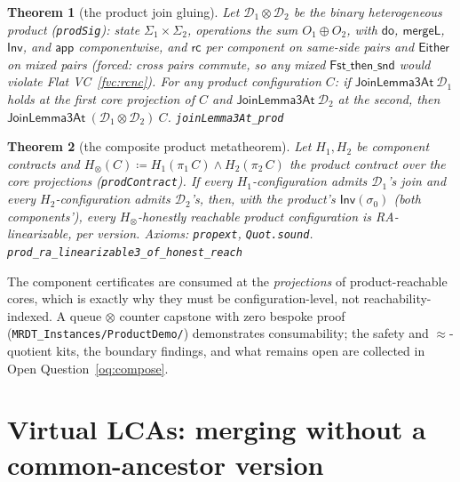 \documentclass[11pt]{article}
\newtheorem{theorem}{Theorem}[section]
\newcommand{\rcrel}{\mathsf{rc}}                 %
\newcommand{\mergeL}{\mathsf{mergeL}}
\newcommand{\Sinit}{\sigma_0}
\newcommand{\lean}[1]{\texttt{#1}}
\newcommand{\M}[1]{\mathcal{#1}}
\newcommand{\dodo}{\mathsf{do}}
\newcommand{\eqobs}{\approx}
\newcommand{\Inv}{\mathsf{Inv}}
\newcommand{\app}{\mathsf{app}}
\newcommand{\Either}{\textsf{Either}}
\begin{document}
\begin{theorem}[the product join gluing]
\label{thm:prodjoin}
Let $\M{D}_1 \otimes \M{D}_2$ be the binary heterogeneous product
(\lean{prodSig}): state $\Sigma_1 \times \Sigma_2$, operations the sum
$O_1 \oplus O_2$, with $\dodo$, $\mergeL$, $\Inv$, and $\app$
componentwise, and $\rcrel$ per component on same-side pairs and
$\Either$ on mixed pairs (forced: cross pairs commute, so any mixed
$\mathsf{Fst\_then\_snd}$ would violate Flat VC~\ref{fvc:rcnc}). For any
product configuration $C$: if $\mathsf{JoinLemma3At}\ \M{D}_1$ holds at
the first core projection of $C$ and $\mathsf{JoinLemma3At}\ \M{D}_2$ at
the second, then $\mathsf{JoinLemma3At}\ (\M{D}_1 \otimes \M{D}_2)\ C$.
\hfill\lean{joinLemma3At\_prod}
\end{theorem}

\begin{theorem}[the composite product metatheorem]
\label{thm:prodmeta}
Let $H_1, H_2$ be component contracts and
$H_\otimes(C) \coloneqq H_1(\pi_1\, C) \wedge H_2(\pi_2\, C)$ the product
contract over the core projections (\lean{prodContract}). If every
$H_1$-configuration admits $\M{D}_1$'s join and every $H_2$-configuration
admits $\M{D}_2$'s, then, with the product's $\Inv(\Sinit)$ (both
components'), every $H_\otimes$-honestly reachable product configuration
is RA-linearizable, per version. Axioms: \lean{propext},
\lean{Quot.sound}.
\hfill\lean{prod\_ra\_linearizable3\_of\_honest\_reach}
\end{theorem}

The component certificates are consumed at the \emph{projections} of
product-reachable cores, which is exactly why they must be
configuration-level, not reachability-indexed. A queue $\otimes$ counter
capstone with zero bespoke proof (\lean{MRDT\_Instances/ProductDemo/})
demonstrates consumability; the safety and $\eqobs$-quotient kits, the
boundary findings, and what remains open are collected in Open
Question~\ref{oq:compose}.

\section{Virtual LCAs: merging without a common-ancestor version}
\label{sec:vlca}
\end{document}
